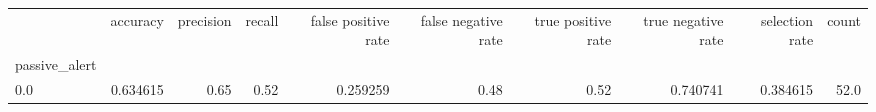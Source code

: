 \begin{tabular}{lrrrrrrrrr}
\toprule
{} &  accuracy &  precision &  recall &  false positive rate &  false negative rate &  true positive rate &  true negative rate &  selection rate &  count \\
passive\_alert &           &            &         &                      &                      &                     &                     &                 &        \\
\midrule
0.0           &  0.634615 &       0.65 &    0.52 &             0.259259 &                 0.48 &                0.52 &            0.740741 &        0.384615 &   52.0 \\
\bottomrule
\end{tabular}
